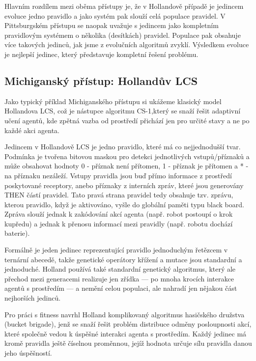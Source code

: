 Hlavním rozdílem mezi oběma přístupy je, že v Hollandově případě je jedincem evoluce jedno pravidlo a jako systém pak slouží celá populace pravidel. V Pittsburgském přístupu se naopak uvažuje s jedincem jako kompletním pravidlovým systémem o několika (desítkách) pravidel. Populace pak obsahuje více takových jedinců, jak jsme z evolučních algoritmů zvyklí.  Výsledkem evoluce je nejlepší jedinec, který představuje kompletní řešení problému. 

\subsection{Michiganský přístup: Hollandův LCS}

Jako typický příklad Michiganského přístupu si ukážeme klasický model Hollandova LCS, což je nástupce algoritmu CS-1,který se snaží řešit adaptivní učení agentů, kde zpětná vazba od prostředí přichází jen pro určité stavy a ne po každé akci agenta. 

Jedincem v Hollandově LCS je jedno pravidlo, které má co nejjednodušší tvar. Podmínka je tvořena bitovou maskou pro detekci jednotlivých vstupů/příznaků a může obsahovat hodnoty 0 - příznak není přítomen, 1 - příznak je přítomen a * - na příznaku nezáleží. Vstupy pravidla jsou buď přímo informace z prostředí poskytované receptory, anebo příznaky z interních zpráv, které jsou generovány THEN částí pravidel. Tato pravá strana pravidel tedy obsahuje tzv. zprávu, kterou pravidlo, když je aktivováno, vyšle do globální paměti typu black board. Zpráva slouží jednak k zakódování akcí agenta (např. robot postoupí o krok kupředu) a jednak k přenosu informací mezi pravidly (např. robotu dochází baterie). 

Formálně je jeden jedinec reprezentující pravidlo jednoduchým řetězcem v ternární abecedě, takže genetické operátory křížení a mutace jsou standardní a jednoduché. Holland používá také standardní genetický algoritmus, který ale přechod mezi generacemi realizuje jen zřídka --- po mnoha krocích interakce agentů s prostředím --- a nemění celou populaci, ale nahradí jen nějakou část nejhorších jedinců. 

Pro práci s fitness navrhl Holland komplikovaný algoritmus hasičského družstva (bucket brigade), jenž se snaží řešit problém distribuce odměny posloupnosti akcí, které společně vedou k úspěšné interakci agenta s prostředím. Každý jedinec má kromě pravidla ještě číselnou proměnnou, jejíž hodnota určuje sílu pravidla danou jeho úspěšností.   

